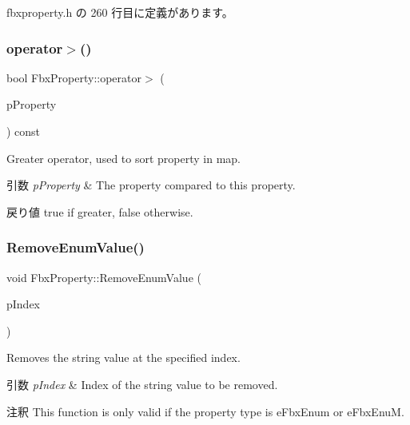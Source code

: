  fbxproperty.\+h の 260 行目に定義があります。

\mbox{\label{class_fbx_property_a78307c874fd49f1721713da94d953423}} 
\subsubsection{\texorpdfstring{operator$>$()}{operator>()}}
{\footnotesize\ttfamily bool Fbx\+Property\+::operator$>$ (\begin{DoxyParamCaption}\item[{const \hyperlink{class_fbx_property}{Fbx\+Property} \&}]{p\+Property }\end{DoxyParamCaption}) const}

Greater operator, used to sort property in map. 
\begin{DoxyParams}{引数}
{\em p\+Property} & The property compared to this property. \\
\hline
\end{DoxyParams}
\begin{DoxyReturn}{戻り値}
{\ttfamily true} if greater, {\ttfamily false} otherwise. 
\end{DoxyReturn}
\mbox{\label{class_fbx_property_aa652adeb57fa64c60cab63ac1df9efa5}} 
\subsubsection{\texorpdfstring{Remove\+Enum\+Value()}{RemoveEnumValue()}}
{\footnotesize\ttfamily void Fbx\+Property\+::\+Remove\+Enum\+Value (\begin{DoxyParamCaption}\item[{int}]{p\+Index }\end{DoxyParamCaption})}

Removes the string value at the specified index. 
\begin{DoxyParams}{引数}
{\em p\+Index} & Index of the string value to be removed. \\
\hline
\end{DoxyParams}
\begin{DoxyRemark}{注釈}
This function is only valid if the property type is e\+Fbx\+Enum or e\+Fbx\+EnuM. 
\end{DoxyRemark}
\mbox{\label{class_fbx_property_a7854464326c74ce7caee2a4263284a46}} 
